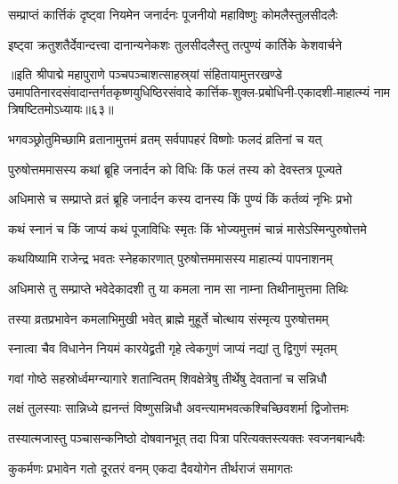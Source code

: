 \twolineshloka
{सम्प्राप्तं कार्त्तिकं दृष्ट्वा नियमेन जनार्दनः}
{पूजनीयो महाविष्णुः कोमलैस्तुलसीदलैः}%

\twolineshloka
{इष्ट्वा क्रतुशतैर्देवान्दत्त्वा दानान्यनेकशः}
{तुलसीदलैस्तु तत्पुण्यं कार्तिके केशवार्चने}%

॥इति श्रीपाद्मे महापुराणे पञ्चपञ्चाशत्साहस्र्यां संहितायामुत्तरखण्डे उमापतिनारदसंवादान्तर्गतकृष्णयुधिष्ठिरसंवादे कार्त्तिक-शुक्ल-प्रबोधिनी-एकादशी-माहात्म्यं नाम त्रिषष्टितमोऽध्यायः॥६३॥


\hyperref[sec:ekadashi_mahatmyam_padma_puranam]{\closesub}
\clearpage

\label{sec:padma-purushottama-masasya krishna-kamala}



\twolineshloka
{भगवञ्छ्रोतुमिच्छामि व्रतानामुत्तमं व्रतम्}
{सर्वपापहरं विष्णोः फलदं व्रतिनां च यत्}%

\twolineshloka
{पुरुषोत्तममासस्य कथां ब्रूहि जनार्दन}
{को विधिः किं फलं तस्य को देवस्तत्र पूज्यते}%

\twolineshloka
{अधिमासे च सम्प्राप्ते व्रतं ब्रूहि जनार्दन}
{कस्य दानस्य किं पुण्यं किं कर्तव्यं नृभिः प्रभो}%

\twolineshloka
{कथं स्नानं च किं जाप्यं कथं पूजाविधिः स्मृतः}
{किं भोज्यमुत्तमं चान्नं मासेऽस्मिन्पुरुषोत्तमे}%


\twolineshloka
{कथयिष्यामि राजेन्द्र भवतः स्नेहकारणात्}
{पुरुषोत्तममासस्य माहात्म्यं पापनाशनम्}%

\twolineshloka
{अधिमासे तु सम्प्राप्ते भवेदेकादशी तु या}
{कमला नाम सा नाम्ना तिथीनामुत्तमा तिथिः}%

\twolineshloka
{तस्या व्रतप्रभावेन कमलाभिमुखी भवेत्}
{ब्राह्मे मुहूर्ते चोत्थाय संस्मृत्य पुरुषोत्तमम्}%

\twolineshloka
{स्नात्वा चैव विधानेन नियमं कारयेद्व्रती}
{गृहे त्वेकगुणं जाप्यं नद्यां तु द्विगुणं स्मृतम्}%

\twolineshloka
{गवां गोष्ठे सहस्रोर्ध्वमग्न्यागारे शतान्वितम्}
{शिवक्षेत्रेषु तीर्थेषु देवतानां च सन्निधौ}%

\twolineshloka
{लक्षं तुलस्याः सान्निध्ये ह्यनन्तं विष्णुसन्निधौ}
{अवन्त्यामभवत्कश्चिच्छिवशर्मा द्विजोत्तमः}%

\twolineshloka
{तस्यात्मजास्तु पञ्चासन्कनिष्ठो दोषवानभूत्}
{तदा पित्रा परित्यक्तस्त्यक्तः स्वजनबान्धवैः}%

\twolineshloka
{कुकर्मणः प्रभावेन गतो दूरतरं वनम्}
{एकदा दैवयोगेन तीर्थराजं समागतः}%

